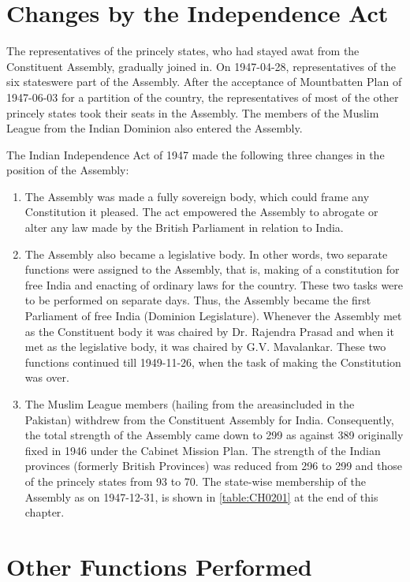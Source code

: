\begin{multicol}{2}
\section{Changes by the Independence Act}

The representatives of the princely states, who had stayed awat from the Constituent Assembly, gradually joined in. On 1947-04-28, representatives of the six states\endnote were part of the Assembly. After the acceptance of Mountbatten Plan of 1947-06-03 for a partition of the country, the representatives of most of the other princely states took their seats in the Assembly. The members of the Muslim League from the Indian Dominion also entered the Assembly.

The Indian Independence Act of 1947 made the following three changes in the position of the Assembly:

\begin{enumerate}
  \item The Assembly was made a fully sovereign body, which could frame any Constitution it pleased. The act empowered the Assembly to abrogate or alter any law made by the British Parliament in relation to India.
  \item The Assembly also became a legislative body. In other words, two separate functions were assigned to the Assembly, that is, making of a constitution for free India and enacting of ordinary laws for the country. These two tasks were to be performed on separate days. Thus, the Assembly became the first Parliament of free India (Dominion Legislature). Whenever the Assembly met as the Constituent body it was chaired by Dr. Rajendra Prasad and when it met as the legislative body\endnote, it was chaired by G.V. Mavalankar. These two functions continued till 1949-11-26, when the task of making the Constitution was over.
  \item The Muslim League members (hailing from the areas\endnote included in the Pakistan) withdrew from the Constituent Assembly for India. Consequently, the total strength of the Assembly came down to 299 as against 389 originally fixed in 1946 under the Cabinet Mission Plan. The strength of the Indian provinces (formerly British Provinces) was reduced from 296 to 299 and those of the princely states from 93 to 70. The state-wise membership of the Assembly as on 1947-12-31, is shown in \ref{table:CH0201} at the end of this chapter.
\end{enumerate}

\section{Other Functions Performed}


\end{multicol}

